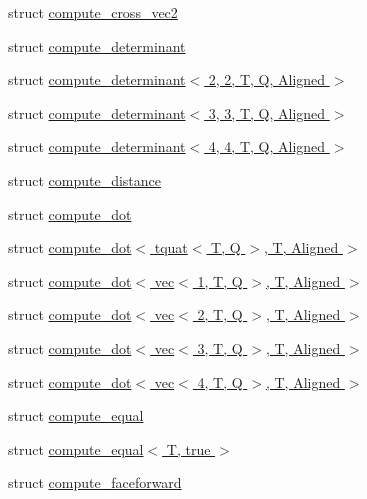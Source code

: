 \begin{DoxyCompactItemize}
\item 
struct \hyperlink{structglm_1_1detail_1_1compute__cross__vec2}{compute\+\_\+cross\+\_\+vec2}
\item 
struct \hyperlink{structglm_1_1detail_1_1compute__determinant}{compute\+\_\+determinant}
\item 
struct \hyperlink{structglm_1_1detail_1_1compute__determinant_3_012_00_012_00_01_t_00_01_q_00_01_aligned_01_4}{compute\+\_\+determinant$<$ 2, 2, T, Q, Aligned $>$}
\item 
struct \hyperlink{structglm_1_1detail_1_1compute__determinant_3_013_00_013_00_01_t_00_01_q_00_01_aligned_01_4}{compute\+\_\+determinant$<$ 3, 3, T, Q, Aligned $>$}
\item 
struct \hyperlink{structglm_1_1detail_1_1compute__determinant_3_014_00_014_00_01_t_00_01_q_00_01_aligned_01_4}{compute\+\_\+determinant$<$ 4, 4, T, Q, Aligned $>$}
\item 
struct \hyperlink{structglm_1_1detail_1_1compute__distance}{compute\+\_\+distance}
\item 
struct \hyperlink{structglm_1_1detail_1_1compute__dot}{compute\+\_\+dot}
\item 
struct \hyperlink{structglm_1_1detail_1_1compute__dot_3_01tquat_3_01_t_00_01_q_01_4_00_01_t_00_01_aligned_01_4}{compute\+\_\+dot$<$ tquat$<$ T, Q $>$, T, Aligned $>$}
\item 
struct \hyperlink{structglm_1_1detail_1_1compute__dot_3_01vec_3_011_00_01_t_00_01_q_01_4_00_01_t_00_01_aligned_01_4}{compute\+\_\+dot$<$ vec$<$ 1, T, Q $>$, T, Aligned $>$}
\item 
struct \hyperlink{structglm_1_1detail_1_1compute__dot_3_01vec_3_012_00_01_t_00_01_q_01_4_00_01_t_00_01_aligned_01_4}{compute\+\_\+dot$<$ vec$<$ 2, T, Q $>$, T, Aligned $>$}
\item 
struct \hyperlink{structglm_1_1detail_1_1compute__dot_3_01vec_3_013_00_01_t_00_01_q_01_4_00_01_t_00_01_aligned_01_4}{compute\+\_\+dot$<$ vec$<$ 3, T, Q $>$, T, Aligned $>$}
\item 
struct \hyperlink{structglm_1_1detail_1_1compute__dot_3_01vec_3_014_00_01_t_00_01_q_01_4_00_01_t_00_01_aligned_01_4}{compute\+\_\+dot$<$ vec$<$ 4, T, Q $>$, T, Aligned $>$}
\item 
struct \hyperlink{structglm_1_1detail_1_1compute__equal}{compute\+\_\+equal}
\item 
struct \hyperlink{structglm_1_1detail_1_1compute__equal_3_01_t_00_01true_01_4}{compute\+\_\+equal$<$ T, true $>$}
\item 
struct \hyperlink{structglm_1_1detail_1_1compute__faceforward}{compute\+\_\+faceforward}

\end{DoxyCompactItemize}
